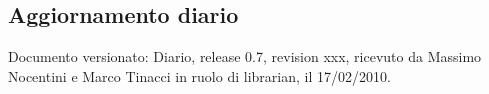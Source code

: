 \subsection{Aggiornamento diario}
Documento versionato: Diario, release 0.7, revision xxx, ricevuto da Massimo 
Nocentini e Marco Tinacci in ruolo di librarian, il 17/02/2010. 